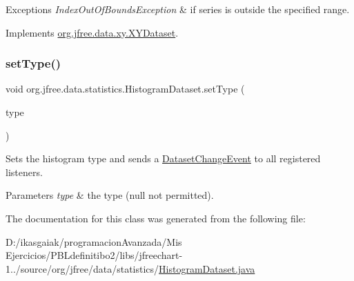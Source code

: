 \begin{DoxyExceptions}{Exceptions}
{\em Index\+Out\+Of\+Bounds\+Exception} & if {\ttfamily series} is outside the specified range. \\
\hline
\end{DoxyExceptions}


Implements \mbox{\hyperlink{interfaceorg_1_1jfree_1_1data_1_1xy_1_1_x_y_dataset_aa915867221e0f94021bad3140db5254e}{org.\+jfree.\+data.\+xy.\+X\+Y\+Dataset}}.

\mbox{\label{classorg_1_1jfree_1_1data_1_1statistics_1_1_histogram_dataset_a676e133775b16985fbe2478c9733e27f}} 
\subsubsection{\texorpdfstring{set\+Type()}{setType()}}
{\footnotesize\ttfamily void org.\+jfree.\+data.\+statistics.\+Histogram\+Dataset.\+set\+Type (\begin{DoxyParamCaption}\item[{\mbox{\hyperlink{classorg_1_1jfree_1_1data_1_1statistics_1_1_histogram_type}{Histogram\+Type}}}]{type }\end{DoxyParamCaption})}

Sets the histogram type and sends a \mbox{\hyperlink{}{Dataset\+Change\+Event}} to all registered listeners.


\begin{DoxyParams}{Parameters}
{\em type} & the type ({\ttfamily null} not permitted). \\
\hline
\end{DoxyParams}


The documentation for this class was generated from the following file\+:\begin{DoxyCompactItemize}
\item 
D\+:/ikasgaiak/programacion\+Avanzada/\+Mis Ejercicios/\+P\+B\+Ldefinitibo2/libs/jfreechart-\/1../source/org/jfree/data/statistics/\mbox{\hyperlink{_histogram_dataset_8java}{Histogram\+Dataset.\+java}}\end{DoxyCompactItemize}
